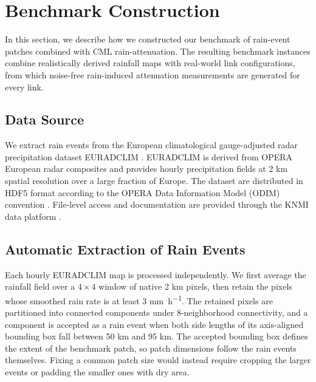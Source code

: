 \documentclass[a4paper,fleqn]{cas-sc}
\newcommand{\notebox}[3]{%
  \begingroup
  \setlength{\fboxsep}{2pt}%
  \fcolorbox{#1}{#2}{\textsf{\footnotesize #3}}%
  \endgroup
}
\DeclareRobustCommand{\editnote}[1]{%
  \texorpdfstring{%
    \nobreak\hfill
    \mbox{\notebox{red!50!black}{red!10}{#1}}%
  }{}%
}
\begin{document}
\section{Benchmark Construction\editnote{GE:stable}}
In this section, we describe how we constructed our benchmark of rain-event patches combined with CML rain-attenuation.  The resulting benchmark instances combine realistically derived rainfall maps with real-world link configurations, from which noise-free rain-induced attenuation measurements are generated for every link.
\subsection{Data Source}
We extract rain events from the European climatological gauge-adjusted radar precipitation dataset EURADCLIM \citep{overeem2023euradclim}. EURADCLIM is derived from OPERA European radar composites and provides hourly precipitation fields at 2 \si{\kilo\meter} spatial resolution over a large fraction of Europe. The dataset are distributed in HDF5 format according to the OPERA Data Information Model (ODIM) convention \citep{odimh5}. File-level access and documentation are provided through the KNMI data platform \citep{knmi_euradclim_project}.

\subsection{Automatic Extraction of Rain Events}
Each hourly EURADCLIM map is processed independently. We first average the rainfall field over a $4 \times 4$ window of native 2 \si{\kilo\meter} pixels, then retain the pixels whose smoothed rain rate is at least 3 \si{\milli\meter\per\hour}. The retained pixels are partitioned into connected components under $8$-neighborhood connectivity, and a component is accepted as a rain event when both side lengths of its axis-aligned bounding box fall between 50 \si{\kilo\meter} and 95 \si{\kilo\meter}. The accepted bounding box defines the extent of the benchmark patch, so patch dimensions follow the rain events themselves. Fixing a common patch size would instead require cropping the larger events or padding the smaller ones with dry area.


\end{document}
